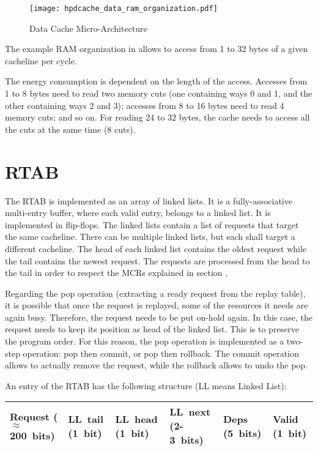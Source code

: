 \documentclass[10pt,titlepage,twoside]{book}
\begin{document}
\begin{figure}[htbp]
  \texttt{[image: hpdcache\_data\_ram\_organization.pdf]}
  \caption{Data Cache Micro-Architecture}
\end{figure}

The example RAM organization in  allows to access from 1 to 32 bytes of a given cacheline per cycle.

The energy consumption is dependent on the length of the access. Accesses from 1 to 8 bytes need to read two memory cuts (one containing ways 0 and 1, and the other containing ways 2 and 3); accesses from 8 to 16 bytes need to read 4 memory cuts; and so on. For reading 24 to 32 bytes, the cache needs to access all the cuts at the same time (8 cuts).

\section{\acf*{RTAB}}

The \ac{RTAB} is implemented as an array of linked lists.
It is a fully-associative multi-entry buffer, where each valid entry, belongs to a linked list.
It is implemented in flip-flops.
The linked lists contain a list of requests that target the same cacheline.
There can be multiple linked lists, but each shall target a different cacheline.
The head of each linked list contains the oldest request while the tail contains the newest request.
The requests are processed from the head to the tail in order to respect the \acp{MCR} explained in section .

Regarding the pop operation (extracting a ready request from the replay table), it is possible that once the request is replayed, some of the resources it needs are again busy.
Therefore, the request needs to be put on-hold again.
In this case, the request needs to keep its position as head of the linked list.
This is to preserve the program order.
For this reason, the pop operation is implemented as a two-step operation: pop then commit, or pop then rollback.
The commit operation allows to actually remove the request, while the rollback allows to undo the pop.

An entry of the \ac{RTAB} has the following structure (LL means Linked List):

\begin{center}
\begin{tabular}{p{.15\linewidth}p{.10\linewidth}p{.10\linewidth}p{.10\linewidth}p{.10\linewidth}p{.07\linewidth}}
  \toprule%
  Request \mbox{($\approx$200 bits)} & \mbox{LL tail} \mbox{(1 bit)} & \mbox{LL head} \mbox{(1 bit)} & \mbox{LL next} \mbox{(2-3 bits)} & Deps \mbox{(5 bits)} & Valid \mbox{(1 bit)} \\
  \midrule%
\end{tabular}
\end{center}
\end{document}
